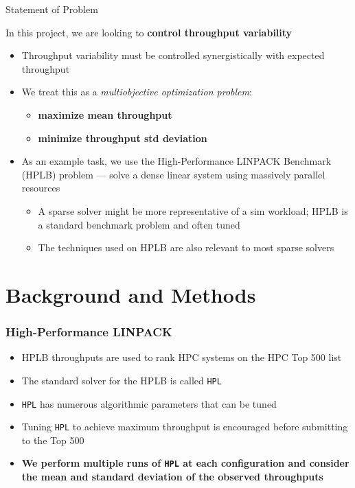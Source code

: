 \documentclass[aspectratio=169]{beamer}
\begin{document}
\begin{frame}{Statement of Problem}

	In this project, we are looking to
	\textbf{control throughput variability}\\

	\medskip

	\begin{itemize}
		\item Throughput variability must be controlled synergistically
			with expected throughput
		\item We treat this as a
			\textit{multiobjective optimization problem}:
			\begin{itemize}
				\item \textbf{maximize mean throughput}
				\item \textbf{minimize throughput std deviation}
			\end{itemize}
		\item As an example task, we use the
			High-Performance LINPACK Benchmark (HPLB) problem
			--- solve a dense linear system using
			massively parallel resources
			\begin{itemize}
				\item A sparse solver might
					be more representative of a
					sim workload; HPLB is a standard
					benchmark problem and often
					tuned
				\item The techniques used on HPLB are also
					relevant to most sparse solvers
			\end{itemize}
	\end{itemize}

\end{frame}

\section{Background and Methods}
\begin{frame}\frametitle{High-Performance LINPACK}
	\begin{itemize}
		\item HPLB throughputs are used to rank HPC systems on
			the HPC Top 500 list
		\item The standard solver for the HPLB is called \texttt{HPL}
		\item \texttt{HPL} has numerous algorithmic parameters that
			can be tuned
		\item Tuning \texttt{HPL} to achieve maximum throughput
			is encouraged before submitting to the Top 500
		\item {\bf We perform multiple runs of \texttt{HPL}
			at each configuration and consider the mean
			and standard deviation of the observed throughputs}
	\end{itemize}
\end{frame}
\end{document}
